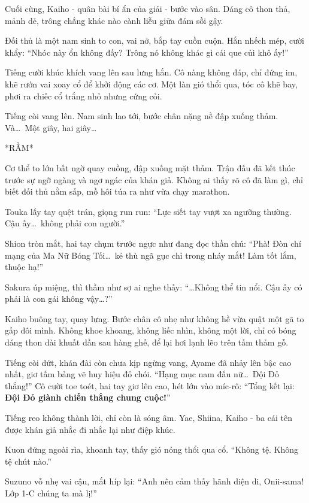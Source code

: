 \documentclass[../main.tex]{subfiles}
\begin{document}
Cuối cùng, Kaiho - quân bài bí ẩn của giải - bước vào sân. Dáng cô thon thả, mảnh dẻ, trông chẳng khác nào cành liễu giữa đám sồi gậy.

Đối thủ là một nam sinh to con, vai nở, bắp tay cuồn cuộn. Hắn nhếch mép, cười khẩy: ``Nhóc này ổn không đấy? Trông nó không khác gì cái que củi khô ấy!''

Tiếng cười khúc khích vang lên sau lưng hắn. Cô nàng không đáp, chỉ đứng im, khẽ rướn vai xoay cổ để khởi động các cơ. Một làn gió thổi qua, tóc cô khẽ bay, phơi ra chiếc cổ trắng nhỏ nhưng cứng cỏi.

Tiếng còi vang lên. Nam sinh lao tới, bước chân nặng nề đập xuống thảm. Và\dots\ Một giây, hai giây\dots

*RẦM*

Cơ thể to lớn bất ngờ quay cuồng, đập xuống mặt thảm. Trận đấu đã kết thúc trước sự ngỡ ngàng và ngơ ngác của khán giả. Không ai thấy rõ cô đã làm gì, chỉ biết đối thủ nằm sấp, mồ hôi túa ra như vừa chạy marathon.

Touka lấy tay quệt trán, giọng run run: ``Lực siết tay vượt xa ngưỡng thường. Cậu ấy\dots\ không phải con người.''

Shion tròn mắt, hai tay chụm trước ngực như đang đọc thần chú: ``Phà! Đòn chí mạng của Ma Nữ Bóng Tối\dots\ kẻ thù ngã gục chỉ trong nháy mắt! Làm tốt lắm, thuộc hạ!''

Sakura úp miệng, thì thầm như sợ ai nghe thấy: ``\dots Không thể tin nổi. Cậu ấy có phải là con gái không vậy\dots?''

Kaiho buông tay, quay lưng. Bước chân cô nhẹ như không hề vừa quật một gã to gấp đôi mình. Không khoe khoang, không liếc nhìn, không một lời, chỉ có bóng dáng thon dài khuất dần sau hàng ghế, để lại hơi lạnh lẽo trên tấm thảm gỗ.

\ct

Tiếng còi dứt, khán đài còn chưa kịp ngừng vang, Ayame đã nhảy lên bậc cao nhất, giơ tấm bảng vẽ huy hiệu đỏ chói.  ``Hạng mục nam đấu nữ\dots\ Đội Đỏ thắng!'' Cô cười toe toét, hai tay giơ lên cao, hét lớn vào míc-rô:  ``Tổng kết lại: \textbf{Đội Đỏ giành chiến thắng chung cuộc!}''

Tiếng reo không thành lời, chỉ còn là sóng âm. Yae, Shiina, Kaiho - ba cái tên được khán giả nhắc đi nhắc lại như điệp khúc.

Kuon đứng ngoài rìa, khoanh tay, thấy gió nóng thổi qua cổ. ``Không tệ. Không tệ chút nào.''

Suzuno vỗ nhẹ vai cậu, mắt híp lại: ``Anh nên cảm thấy hãnh diện di, Onii-sama! Lớp 1-C chúng ta mà lị!''
\end{document}
